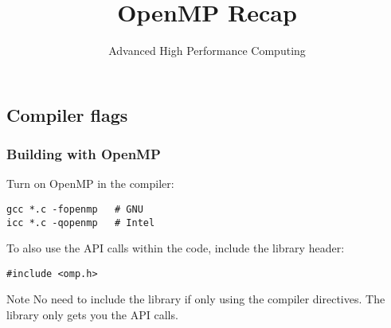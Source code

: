 \documentclass{beamer}
\title{OpenMP Recap}
\subtitle{Advanced High Performance Computing}
\begin{document}
\frame{\titlepage}

\subsection{Compiler flags}
\begin{frame}[fragile]
\frametitle{Building with OpenMP}

Turn on OpenMP in the compiler:
\begin{verbatim}
gcc *.c -fopenmp   # GNU
icc *.c -qopenmp   # Intel
\end{verbatim}

To also use the API calls within the code, include the library header:
\begin{verbatim}
#include <omp.h>
\end{verbatim}

\begin{alertblock}{Note}
No need to include the library if only using the compiler directives.
The library only gets you the API calls.
\end{alertblock}
\end{frame}

\end{document}
